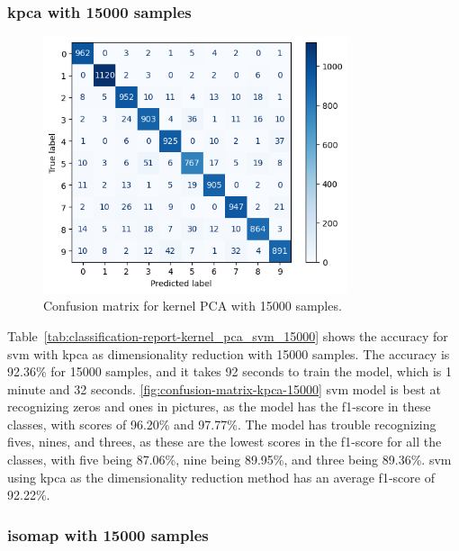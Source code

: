 \subsubsection{\gls{kpca} with 15000 samples}\label{subsubsec:experiment-1-results-kernel_pca-15000}





\begin{figure}[htb!]
    \centering
    \includegraphics[width=0.8\textwidth]{figures/1-experiment/confusion_matrix_kernel_pca_svm_15000.png}
    \caption{Confusion matrix for kernel PCA with 15000 samples.}
    \label{fig:confusion-matrix-kpca-15000}
\end{figure}


Table~\ref{tab:classification-report-kernel_pca_svm_15000} shows the accuracy for \gls{svm} with \gls{kpca} as dimensionality reduction with 15000 samples. The accuracy is 92.36\% for 15000 samples, and it takes 92 seconds to train the model, which is 1 minute and 32 seconds. \autoref{fig:confusion-matrix-kpca-15000} \gls{svm} model is best at recognizing zeros and ones in pictures, as the model has the f1-score in these classes, with scores of 96.20\% and 97.77\%. The model has trouble recognizing fives, nines, and threes, as these are the lowest scores in the f1-score for all the classes, with five being 87.06\%, nine being 89.95\%, and three being 89.36\%. \gls{svm} using \gls{kpca} as the dimensionality reduction method has an average f1-score of 92.22\%.

\subsubsection{\gls{isomap} with 15000 samples}\label{subsubsec:experiment-1-results-isomap-15000}




